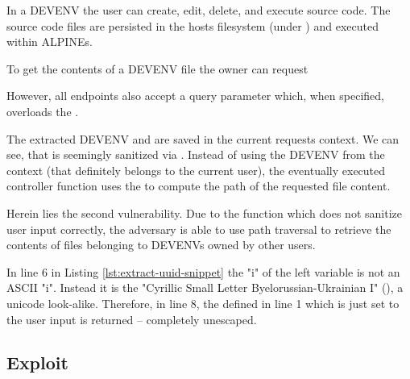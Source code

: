 \documentclass[10pt]{article}
\begin{document}
In a DEVENV the user can create, edit, delete, and execute source code. The source code files are persisted in the hosts filesystem (under ) and executed within ALPINEs.

To get the contents of a DEVENV file the owner can request
\begin{center}
\end{center}
However, all  endpoints also accept a query parameter  which, when specified, overloads the .



The extracted DEVENV and  are saved in the current requests context. We can see, that  is seemingly sanitized via . Instead of using the DEVENV from the context (that definitely belongs to the current user), the eventually executed controller function  uses the  to compute the path of the requested file content.

\newpage


Herein lies the second vulnerability. Due to the  function which does not sanitize user input correctly, the adversary is able to use path traversal to retrieve the contents of files belonging to DEVENVs owned by other users.



In line 6 in Listing \ref{lst:extract-uuid-snippet} the "i" of the left  variable is not an ASCII "i". Instead it is the "Cyrillic Small Letter Byelorussian-Ukrainian I" (), a unicode look-alike. Therefore, in line 8, the  defined in line 1 which is just set to the user input is returned -- completely unescaped.

\subsection{Exploit}
\end{document}
